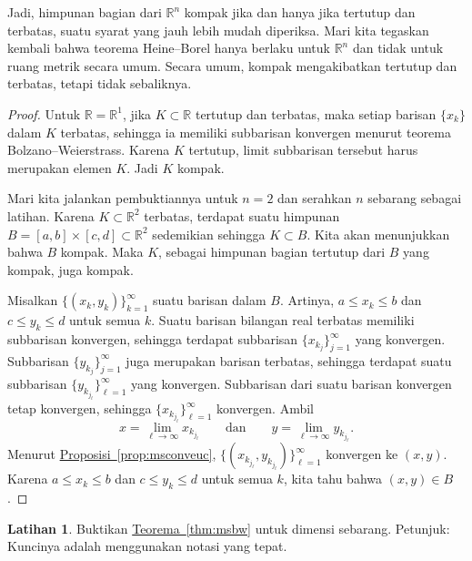 \documentclass[12pt,openany]{book}
\newcommand{\R}{{\mathbb{R}}}
\theoremstyle{plain}
\theoremstyle{remark}
\theoremstyle{definition}
\newenvironment{exbox}{%
    \def\FrameCommand{\vrule width 1pt \relax\hspace{10pt}}%
    \MakeFramed{\advance\hsize-\width\FrameRestore}%
}{%
    \endMakeFramed
}
\theoremstyle{exercise}
\newtheorem{exercise}{Latihan}[section]
\theoremstyle{example}
\newcommand{\thmref}[1]{\hyperref[#1]{Teorema~\ref*{#1}}}
\newcommand{\propref}[1]{\hyperref[#1]{Proposisi~\ref*{#1}}}
\begin{document}
Jadi, himpunan bagian dari $\R^n$ kompak jika dan hanya jika tertutup dan terbatas,
suatu syarat yang jauh lebih mudah diperiksa.
Mari kita tegaskan kembali bahwa teorema Heine--Borel hanya berlaku untuk $\R^n$ dan tidak
untuk ruang metrik secara umum. Secara umum, kompak mengakibatkan tertutup dan
terbatas, tetapi tidak sebaliknya.

\begin{proof}
Untuk $\R = \R^1$, jika $K \subset \R$ tertutup dan terbatas, maka
setiap barisan $\{ x_k \}$ dalam $K$ terbatas, sehingga ia memiliki subbarisan konvergen
menurut
teorema Bolzano--Weierstrass.
Karena $K$ tertutup, limit subbarisan tersebut harus merupakan elemen
$K$. Jadi $K$ kompak.

Mari kita jalankan pembuktiannya untuk $n=2$ dan serahkan $n$ sebarang sebagai latihan.
Karena $K \subset \R^2$ terbatas, terdapat suatu himpunan
$B=[a,b]\times[c,d] \subset \R^2$ sedemikian sehingga $K \subset B$. Kita akan menunjukkan
bahwa $B$ kompak. Maka $K$, sebagai himpunan bagian tertutup dari $B$ yang kompak, juga
kompak.

Misalkan $\bigl\{ (x_k,y_k) \bigr\}_{k=1}^\infty$ suatu barisan dalam $B$. Artinya,
$a \leq x_k \leq b$ dan
$c \leq y_k \leq d$ untuk semua $k$. Suatu barisan bilangan real terbatas
memiliki subbarisan
konvergen, sehingga terdapat subbarisan $\{ x_{k_j} \}_{j=1}^\infty$
yang konvergen. Subbarisan
$\{ y_{k_j} \}_{j=1}^\infty$ juga merupakan barisan terbatas, sehingga terdapat
suatu subbarisan
$\{ y_{k_{j_\ell}} \}_{\ell=1}^\infty$ yang konvergen. Subbarisan dari suatu barisan
konvergen tetap konvergen, sehingga
$\{ x_{k_{j_\ell}} \}_{\ell=1}^\infty$ konvergen.
Ambil
\begin{equation*}
x = \lim_{\ell\to\infty} x_{k_{j_\ell}}
\qquad \text{dan} \qquad
y = \lim_{\ell\to\infty} y_{k_{j_\ell}} .
\end{equation*}
Menurut \propref{prop:msconveuc},
$\bigl\{ (x_{k_{j_\ell}},y_{k_{j_\ell}}) \bigr\}_{\ell=1}^\infty$ konvergen ke $(x,y)$.
Karena $a \leq x_k \leq b$ dan
$c \leq y_k \leq d$ untuk semua $k$, kita tahu bahwa $(x,y) \in B$.
\end{proof}

\begin{exbox}
\begin{exercise}
Buktikan \thmref{thm:msbw} untuk dimensi sebarang.
Petunjuk: Kuncinya adalah menggunakan notasi yang tepat.
\end{exercise}
\end{exbox}
\end{document}
